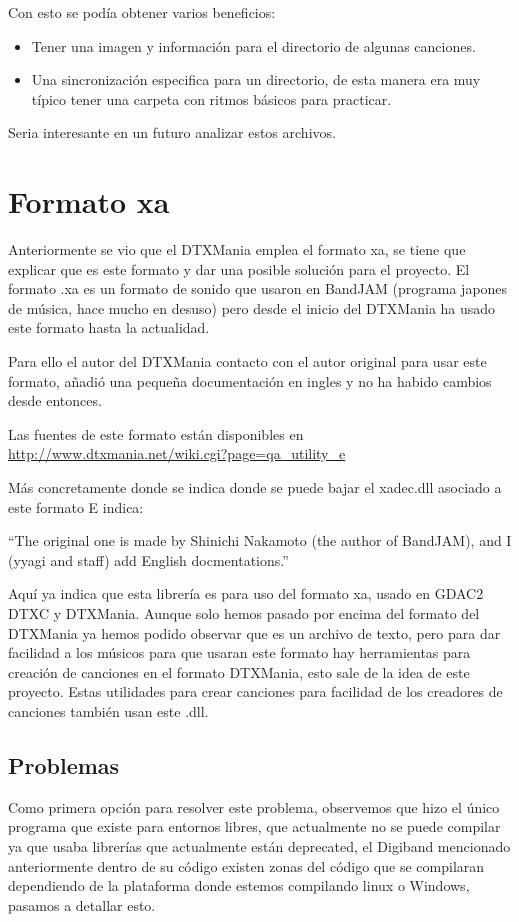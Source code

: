 \documentclass[a4paper,11pt,oneside]{book}
\begin{document}
Con esto se podía obtener varios beneficios:

\begin{itemize}
\item Tener una imagen y información para el directorio de algunas canciones.
\item Una sincronización especifica para un directorio, de esta manera era muy típico tener una carpeta con ritmos básicos para practicar.
\end{itemize}

Seria interesante en un futuro analizar estos archivos.

\chapter{Formato xa}
Anteriormente se vio que el DTXMania emplea el formato xa, se tiene que explicar que es este formato y dar una posible solución para el proyecto.
El formato .xa es un formato de sonido que usaron en BandJAM (programa japones de música, hace mucho en desuso) pero desde el inicio del DTXMania ha usado este formato hasta la actualidad.

Para ello el autor del DTXMania contacto con el autor original para usar este formato, añadió una pequeña documentación en ingles y no ha habido cambios desde entonces.

Las fuentes de este formato están disponibles en \url{http://www.dtxmania.net/wiki.cgi?page=qa_utility_e}

Más concretamente donde se indica donde se puede bajar el xadec.dll asociado a este formato
E indica:

``The original one is made by Shinichi Nakamoto (the author of BandJAM), and I (yyagi and staff) add English docmentations.''

Aquí ya indica que esta librería es para uso del formato xa, usado en GDAC2 DTXC y DTXMania.
Aunque solo hemos pasado por encima del formato del DTXMania ya hemos podido observar que es un archivo de texto, pero para dar facilidad a los músicos para que usaran este formato hay herramientas para creación de canciones en el formato DTXMania, esto sale de la idea de este proyecto.
Estas utilidades para crear canciones para facilidad de los creadores de canciones también usan este .dll.

\section{Problemas}
Como primera opción para resolver este problema, observemos que hizo el único programa que existe para entornos libres, que actualmente no se puede compilar ya que usaba librerías que actualmente están deprecated, el Digiband mencionado anteriormente dentro de su código existen zonas del código que se compilaran dependiendo de la plataforma donde estemos compilando linux o Windows, pasamos a detallar esto.
\end{document}
